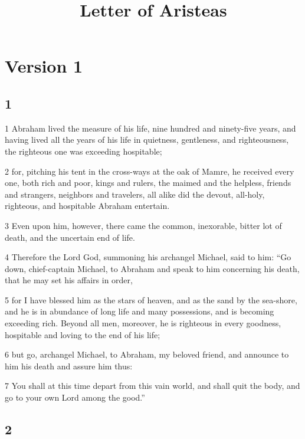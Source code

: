 

\title{Letter of Aristeas}

\part{Version 1}

\chapter{1}

\par 1 Abraham lived the measure of his life, nine hundred and ninety-five years, and having lived all the years of his life in quietness, gentleness, and righteousness, the righteous one was exceeding hospitable; 

\par 2 for, pitching his tent in the cross-ways at the oak of Mamre, he received every one, both rich and poor, kings and rulers, the maimed and the helpless, friends and strangers, neighbors and travelers, all alike did the devout, all-holy, righteous, and hospitable Abraham entertain. 

\par 3 Even upon him, however, there came the common, inexorable, bitter lot of death, and the uncertain end of life. 

\par 4 Therefore the Lord God, summoning his archangel Michael, said to him: “Go down, chief-captain Michael, to Abraham and speak to him concerning his death, that he may set his affairs in order, 

\par 5 for I have blessed him as the stars of heaven, and as the sand by the sea-shore, and he is in abundance of long life and many possessions, and is becoming exceeding rich. Beyond all men, moreover, he is righteous in every goodness, hospitable and loving to the end of his life; 

\par 6 but go, archangel Michael, to Abraham, my beloved friend, and announce to him his death and assure him thus: 

\par 7 You shall at this time depart from this vain world, and shall quit the body, and go to your own Lord among the good.”

\chapter{2}

